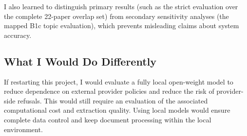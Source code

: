 \documentclass[runningheads]{llncs}
\begin{document}
I also learned to distinguish primary results (such as the strict evaluation over the complete 22-paper overlap set) from secondary sensitivity analyses (the mapped B1c topic evaluation), which prevents misleading claims about system accuracy.

\subsection*{What I Would Do Differently}
If restarting this project, I would evaluate a fully local open-weight model to reduce dependence on external provider policies and reduce the risk of provider-side refusals. This would still require an evaluation of the associated computational cost and extraction quality. Using local models would ensure complete data control and keep document processing within the local environment.



\end{document}
